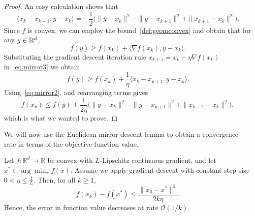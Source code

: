 \begin{proof}
An easy calculation shows that
\begin{equation}
    \label{eq:mirror2}
\langle x_k - x_{k+1}, y - x_k \rangle = - \frac{1}{2}\Big( \|y-x_k\|^2 - \|y-x_{k+1}\|^2  + \|x_{k+1} - x_k\|^2 \Big).
\end{equation}
Since $f$ is convex, we can employ the bound~\eqref{def:geomconvex} and obtain that for any $y \in \mathbb{R}^d$,
\begin{equation}
    \label{eq:mirror3}
f(y) \ge f(x_k) + \langle \nabla f(x_k) , y - x_k \rangle.
\end{equation}
Substituting the gradient descent iteration rule $x_{k+1} = x_k - \eta \nabla f(x_k)$ in~\eqref{eq:mirror3} we obtain
\begin{equation}
    \label{eq:mirror4}
f(y) \ge f(x_k) + \frac{1}{\eta} \langle x_k - x_{k+1} , y - x_k \rangle.
\end{equation}
Using~\eqref{eq:mirror2}, and rearranging terms gives
$$
f(x_k) \le f(y) + \frac{1}{2\eta} \Big( \|y-x_k\|^2 - \|y-x_{k+1}\|^2  + \|x_{k+1} - x_k\|^2 \Big),
$$
which is what we wanted to prove. 
\end{proof}
We will now use the Euclidean mirror descent lemma  to obtain a convergence rate
in terms of the objective function value.

\begin{theorem}\label{th:gradconv1}
Let $f : \mathbb{R}^d \to \mathbb{R}$ be convex with $L$-Lipschitz continuous gradient, and let $x^* \in \arg\min_x f(x)$. 
Assume we apply gradient descent with constant step size $ 0 < \eta\le  \frac{1}{L}$. 
Then, for all $k \ge 1$,
$$
f(x_k) - f(x^*) \le \frac{\|x_0 - x^*\|^2}{2k\eta}.
$$
Hence, the error in function value decreases at rate ${\mathcal O}(1/k)$.
\end{theorem}

